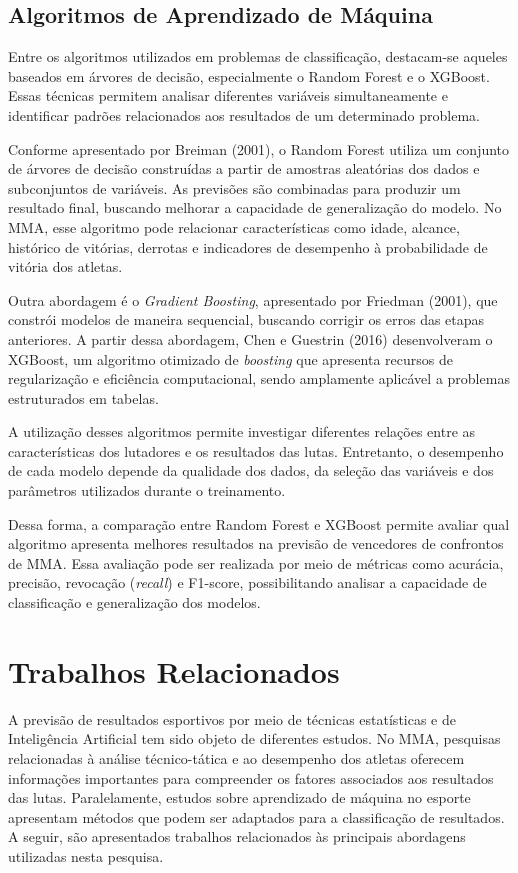 \documentclass[12pt,a4paper]{report}
\begin{document}
\section{Algoritmos de Aprendizado de Máquina}

Entre os algoritmos utilizados em problemas de classificação, destacam-se aqueles baseados em árvores de decisão, especialmente o Random Forest e o XGBoost. Essas técnicas permitem analisar diferentes variáveis simultaneamente e identificar padrões relacionados aos resultados de um determinado problema.

Conforme apresentado por Breiman (2001), o Random Forest utiliza um conjunto de árvores de decisão construídas a partir de amostras aleatórias dos dados e subconjuntos de variáveis. As previsões são combinadas para produzir um resultado final, buscando melhorar a capacidade de generalização do modelo. No MMA, esse algoritmo pode relacionar características como idade, alcance, histórico de vitórias, derrotas e indicadores de desempenho à probabilidade de vitória dos atletas.

Outra abordagem é o \textit{Gradient Boosting}, apresentado por Friedman (2001), que constrói modelos de maneira sequencial, buscando corrigir os erros das etapas anteriores. A partir dessa abordagem, Chen e Guestrin (2016) desenvolveram o XGBoost, um algoritmo otimizado de \textit{boosting} que apresenta recursos de regularização e eficiência computacional, sendo amplamente aplicável a problemas estruturados em tabelas.

A utilização desses algoritmos permite investigar diferentes relações entre as características dos lutadores e os resultados das lutas. Entretanto, o desempenho de cada modelo depende da qualidade dos dados, da seleção das variáveis e dos parâmetros utilizados durante o treinamento.

Dessa forma, a comparação entre Random Forest e XGBoost permite avaliar qual algoritmo apresenta melhores resultados na previsão de vencedores de confrontos de MMA. Essa avaliação pode ser realizada por meio de métricas como acurácia, precisão, revocação (\textit{recall}) e F1-score, possibilitando analisar a capacidade de classificação e generalização dos modelos.

\chapter{Trabalhos Relacionados}

A previsão de resultados esportivos por meio de técnicas estatísticas e de Inteligência Artificial tem sido objeto de diferentes estudos. No MMA, pesquisas relacionadas à análise técnico-tática e ao desempenho dos atletas oferecem informações importantes para compreender os fatores associados aos resultados das lutas. Paralelamente, estudos sobre aprendizado de máquina no esporte apresentam métodos que podem ser adaptados para a classificação de resultados. A seguir, são apresentados trabalhos relacionados às principais abordagens utilizadas nesta pesquisa.
\end{document}
